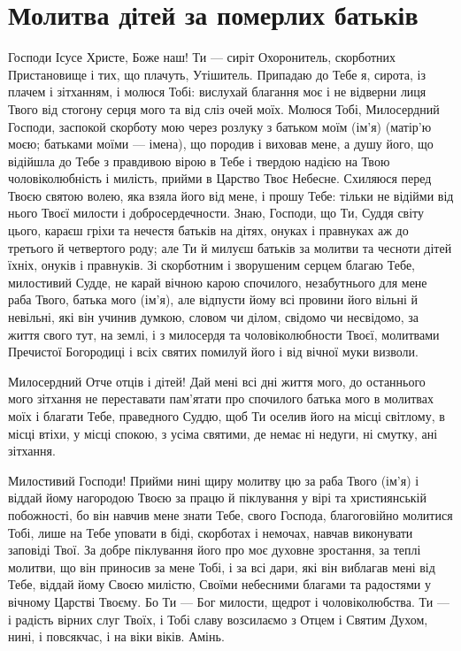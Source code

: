 \documentclass[chapters.tex]{subfiles}
\begin{document}
\section{Молитва дітей за померлих батьків}
Господи Ісусе Христе, Боже наш! Ти — сиріт Охоронитель, скорботних Пристановище і тих, що плачуть, Утішитель. Припадаю до Тебе я, сирота, із плачем і зітханням, і молюся Тобі: вислухай благання моє і не відверни лиця Твого від стогону серця мого та від сліз очей моїх. Молюся Тобі, Милосердний Господи, заспокой скорботу мою через розлуку з батьком моїм (ім’я) (матір’ю моєю; батьками моїми — імена), що породив і виховав мене, а душу його, що відійшла до Тебе з правдивою вірою в Тебе і твердою надією на Твою чоловіколюбність і милість, прийми в Царство Твоє Небесне. Схиляюся перед Твоєю святою волею, яка взяла його від мене, і прошу Тебе: тільки не відійми від нього Твоєї милости і добросердечности. Знаю, Господи, що Ти, Суддя світу цього, караєш гріхи та нечестя батьків на дітях, онуках і правнуках аж до третього й четвертого роду; але Ти й милуєш батьків за молитви та чесноти дітей їхніх, онуків і правнуків. Зі скорботним і зворушеним серцем благаю Тебе, милостивий Судде, не карай вічною карою спочилого, незабутнього для мене раба Твого, батька мого (ім’я), але відпусти йому всі провини його вільні й невільні, які він учинив думкою, словом чи ділом, свідомо чи несвідомо, за життя свого тут, на землі, і з милосердя та чоловіколюбности Твоєї, молитвами Пречистої Богородиці і всіх святих помилуй його і від вічної муки визволи.

Милосердний Отче отців і дітей! Дай мені всі дні життя мого, до останнього мого зітхання не переставати пам’ятати про спочилого батька мого в молитвах моїх і благати Тебе, праведного Суддю, щоб Ти оселив його на місці світлому, в місці втіхи, у місці спокою, з усіма святими, де немає ні недуги, ні смутку, ані зітхання.

Милостивий Господи! Прийми нині щиру молитву цю за раба Твого (ім’я) і віддай йому нагородою Твоєю за працю й піклування у вірі та християнській побожності, бо він навчив мене знати Тебе, свого Господа, благоговійно молитися Тобі, лише на Тебе уповати в біді, скорботах і немочах, навчав виконувати заповіді Твої. За добре піклування його про моє духовне зростання, за теплі молитви, що він приносив за мене Тобі, і за всі дари, які він виблагав мені від Тебе, віддай йому Своєю милістю, Своїми небесними благами та радостями у вічному Царстві Твоєму. Бо Ти — Бог милости, щедрот і чоловіколюбства. Ти — і радість вірних слуг Твоїх, і Тобі славу возсилаємо з Отцем і Святим Духом, нині, і повсякчас, і на віки віків. Амінь.
\end{document}

